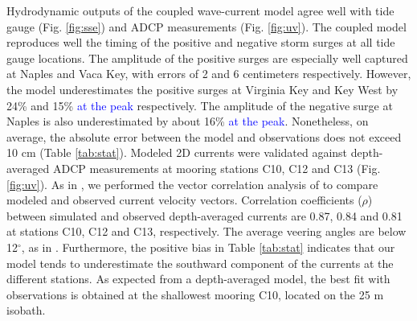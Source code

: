 \documentclass[preprint,12pt,authoryear]{elsarticle}
\newcommand{\modif}[1]{\textcolor{blue}{#1}}
\begin{document}
Hydrodynamic outputs of the coupled wave-current model agree well with tide gauge (Fig. \ref{fig:sse}) and ADCP measurements (Fig. \ref{fig:uv}). The coupled model reproduces well the timing of the positive and negative storm surges at all tide gauge locations. The amplitude of the positive surges are especially well captured at Naples and Vaca Key, with errors of 2 and 6 centimeters respectively. However, the model underestimates the positive surges at Virginia Key and Key West by 24\% and 15\% \modif{at the peak} respectively. The amplitude of the negative surge at Naples is also underestimated by about 16\% \modif{at the peak}. Nonetheless, on average, the absolute error between the model and observations does not exceed 10 cm (Table \ref{tab:stat}). Modeled 2D currents were validated against depth-averaged ADCP measurements at mooring stations C10, C12 and C13 (Fig. \ref{fig:uv}). As in \cite{liu2020impacts}, we performed the vector correlation analysis of \cite{kundu1976ekman} to compare modeled and observed current velocity vectors. Correlation coefficients ($\rho$) between simulated and observed depth-averaged currents are 0.87, 0.84 and 0.81 at stations C10, C12 and C13, respectively. The average veering angles are below 12$^\circ$, as in \citep{liu2020impacts}. Furthermore, the positive bias in Table \ref{tab:stat} indicates that our model tends to underestimate the southward component of the currents at the different stations. As expected from a depth-averaged model, the best fit with observations is obtained at the shallowest mooring C10, located on the 25 m isobath. 
\end{document}
